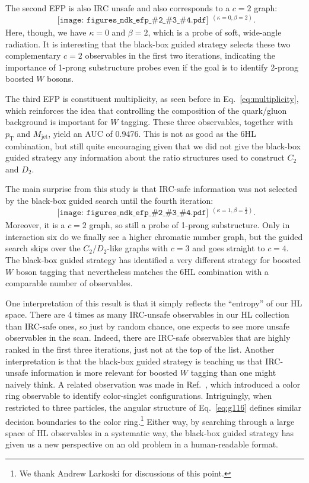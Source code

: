 \documentclass[aps,prd,twocolumn,superscriptaddress,preprintnumbers,nofootinbib,longbibliography,floatfix]{revtex4-1}
\newcommand{\rref}[1]{Ref.~\cite{#1}}
\newcommand{\Eq}[1]{Eq.~\eqref{#1}}
\newcommand{\ndk}[4]{
	\begin{gathered}\texttt{[image: figures\_ndk\_efp\_\#2\_\#3\_\#4.pdf]}\end{gathered}
}
\begin{document}
The second EFP is also IRC unsafe and also corresponds to a $c = 2$ graph:
\begin{equation}
	\label{eq:g84}
	\ndk{0.045}{2}{4}{0} {}^{(\kappa = 0, \beta = 2)}.
\end{equation}
Here, though, we have $\kappa = 0$ and $\beta = 2$, which is a probe of soft, wide-angle radiation. It is interesting that the black-box guided strategy selects these two complementary $c = 2$ observables in the first two iterations, indicating the importance of 1-prong substructure probes even if the goal is to identify 2-prong boosted $W$ bosons. 

The third EFP is constituent multiplicity, as seen before in \Eq{eq:multiplicity}, which reinforces the idea that controlling the composition of the quark/gluon background is important for $W$ tagging. These three observables, together with $p_{\textrm{T}}$ and $M_{\textrm{jet}}$, yield an AUC of 0.9476. This is not as good as the 6HL combination, but still quite encouraging given that we did not give the black-box guided strategy any information about the ratio structures used to construct $C_2$ and $D_2$.

The main surprise from this study is that IRC-safe information was not selected by the black-box guided search until the fourth iteration:
\begin{equation}
	\label{eq:fourth}
	\ndk{0.045}{8}{7}{0} {}^{\left(\kappa = 1, \beta = \frac{1}{2}\right)}.
\end{equation}
Moreover, it is a $c= 2$ graph, so still a probe of 1-prong substructure. Only in interaction six do we finally see a higher chromatic number graph, but the guided search skips over the $C_2/D_2$-like graphs with $c = 3$ and goes straight to $c = 4$. The black-box guided strategy has identified a very different strategy for boosted $W$ boson tagging that nevertheless matches the 6HL combination with a comparable number of observables.

One interpretation of this result is that it simply reflects the ``entropy'' of our HL space. There are 4 times as many IRC-unsafe observables in our HL collection than IRC-safe ones, so just by random chance, one expects to see more unsafe observables in the scan. Indeed, there are IRC-safe observables that are highly ranked in the first three iterations, just not at the top of the list. Another interpretation is that the black-box guided strategy is teaching us that IRC-unsafe information is more relevant for boosted $W$ tagging than one might naively think. A related observation was made in \rref{Buckley:2020kdp}, which introduced a color ring observable to identify color-singlet configurations. Intriguingly, when restricted to three particles, the angular structure of \Eq{eq:g116} defines similar decision boundaries to the color ring.\footnote{We thank Andrew Larkoski for discussions of this point.} Either way, by searching through a large space of HL observables in a systematic way, the black-box guided strategy has given us a new perspective on an old problem in a human-readable format.
\end{document}
